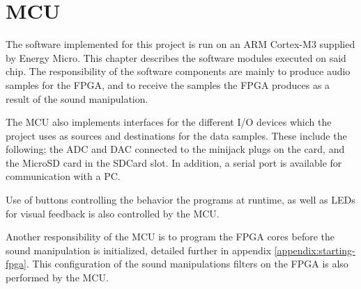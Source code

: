 \clearpage
\section{MCU} \label{section:mcu}

The software implemented for this project is run on an ARM Cortex-M3 supplied by Energy Micro. This chapter describes the
software modules executed on said chip. The responsibility of the software
components are mainly to produce audio samples for the FPGA, and to receive the
samples the FPGA produces as a result of the sound manipulation.

The MCU also implements interfaces for the different I/O devices which the
project uses as sources and destinations for the data samples. These include the
following; the ADC and DAC connected to the minijack plugs on the card, and the
MicroSD card in the SDCard slot. In addition, a serial port is available for
communication with a PC.

Use of buttons controlling the behavior the programs at runtime, as well as LEDs
for visual feedback is also controlled by the MCU.

Another responsibility of the MCU is to program the FPGA cores before the sound
manipulation is initialized, detailed further in appendix
\ref{appendix:starting-fpga}. This configuration of the sound manipulations
filters on the FPGA is also performed by the MCU.





